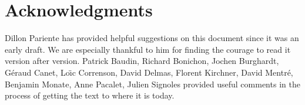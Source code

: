 \documentclass{frama-c-book}
\begin{document}


\section*{Acknowledgments}

Dillon Pariente has provided helpful suggestions on this document
since it was an early draft. We are especially thankful to him for
finding the courage to read it version after version.
Patrick Baudin, Richard Bonichon,
Jochen Burghardt,
G\'eraud Canet, Lo\"\i c Correnson,
David Delmas, Florent Kirchner, David Mentr\'e, Benjamin Monate, Anne Pacalet,
Julien Signoles provided useful comments in the process of
getting the text to where it is today.


\end{document}
